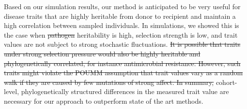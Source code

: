 \documentclass[12pt]{article} %
\providecommand{\DIFadd}[1]{{\protect\color{blue}\uwave{#1}}} %
\providecommand{\DIFdel}[1]{{\protect\color{red}\sout{#1}}}                      %
\providecommand{\DIFaddbegin}{} %
\providecommand{\DIFaddend}{} %
\providecommand{\DIFdelbegin}{} %
\providecommand{\DIFdelend}{} %
\newcommand{\DIFscaledelfig}{0.5}
\newlength{\DIFdelgraphicswidth} %
\newlength{\DIFdelgraphicsheight} %
\newcommand{\DIFaddincludegraphics}[2][]{{\color{blue}\fbox{\DIFOincludegraphics[#1]{#2}}}} %
\newcommand{\DIFdelincludegraphics}[2][]{%
\sbox{\DIFdelgraphicsbox}{\DIFOincludegraphics[#1]{#2}}%
\settoboxwidth{\DIFdelgraphicswidth}{\DIFdelgraphicsbox} %
\settoboxtotalheight{\DIFdelgraphicsheight}{\DIFdelgraphicsbox} %
\scalebox{\DIFscaledelfig}{%
\parbox[b]{\DIFdelgraphicswidth}{\usebox{\DIFdelgraphicsbox}\\[-\baselineskip] \rule{\DIFdelgraphicswidth}{0em}}\llap{\resizebox{\DIFdelgraphicswidth}{\DIFdelgraphicsheight}{%
\setlength{\unitlength}{\DIFdelgraphicswidth}%
\begin{picture}(1,1)%
\thicklines\linethickness{2pt} %
{\color[rgb]{1,0,0}\put(0,0){\framebox(1,1){}}}%
{\color[rgb]{1,0,0}\put(0,0){\line( 1,1){1}}}%
{\color[rgb]{1,0,0}\put(0,1){\line(1,-1){1}}}%
\end{picture}%
}\hspace*{3pt}}} %
} %
\DeclareRobustCommand{\DIFaddbegin}{\DIFOaddbegin \let\includegraphics\DIFaddincludegraphics} %
\DeclareRobustCommand{\DIFaddend}{\DIFOaddend \let\includegraphics\DIFOincludegraphics} %
\DeclareRobustCommand{\DIFdelbegin}{\DIFOdelbegin \let\includegraphics\DIFdelincludegraphics} %
\DeclareRobustCommand{\DIFdelend}{\DIFOaddend \let\includegraphics\DIFOincludegraphics} %
\begin{document}
\begin{doublespace}
\DIFaddend Based on our simulation results, our method is anticipated to be very useful for disease traits that are highly heritable from donor to recipient and  maintain a high correlation between sampled individuals. In simulations, we showed this is the case when \DIFdelbegin \DIFdel{pathogen }\DIFdelend heritability is high, selection strength is low, and trait values are not subject to strong stochastic fluctuations. \DIFdelbegin \DIFdel{It is possible that traits under strong selection pressure would also be highly heritable and phylogenetically correlated, for instance antimicrobial resistance. However, such traits might violate the POUMM assumption that trait values vary as a random walk if they are caused by few mutations of strong affect. In summary, }\DIFdelend \DIFaddbegin \DIFadd{So, }\DIFaddend cohort-level, phylogenetically structured differences in the measured trait value are necessary for our approach to outperform state of the art methods. 


\end{doublespace}
\end{document}
